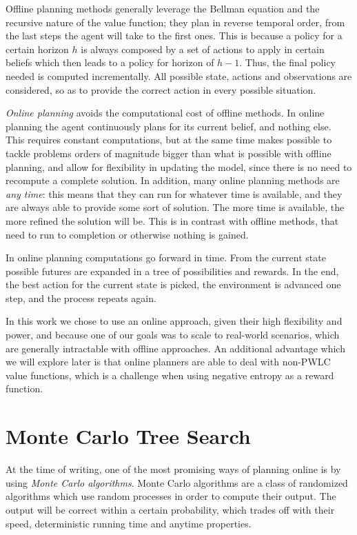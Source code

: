 Offline planning methods generally leverage the Bellman equation and the recursive nature of the
value function; they plan in reverse temporal order, from the last steps the agent will take to the
first ones. This is because a policy for a certain horizon $h$ is always composed by a set of
actions to apply in certain beliefs which then leads to a policy for horizon of $h-1$. Thus, the
final policy needed is computed incrementally. All possible state, actions and observations are
considered, so as to provide the correct action in every possible situation.

\textit{Online planning} avoids the computational cost of offline methods. In online planning the
agent continuously plans for its current belief, and nothing else. This requires constant
computations, but at the same time makes possible to tackle problems orders of magnitude bigger than
what is possible with offline planning, and allow for flexibility in updating the model, since there
is no need to recompute a complete solution. In addition, many online planning methods are
\textit{any time}: this means that they can run for whatever time is available, and they are always
able to provide some sort of solution. The more time is available, the more refined the solution
will be. This is in contrast with offline methods, that need to run to completion or otherwise
nothing is gained.

In online planning computations go forward in time. From the current state possible futures are
expanded in a tree of possibilities and rewards. In the end, the best action for the current state
is picked, the environment is advanced one step, and the process repeats again.

In this work we chose to use an online approach, given their high flexibility and power, and because
one of our goals was to scale to real-world scenarios, which are generally intractable with offline
approaches. An additional advantage which we will explore later is that online planners are able to
deal with non-PWLC value functions, which is a challenge when using negative entropy as a reward
function.

\section{Monte Carlo Tree Search}

At the time of writing, one of the most promising ways of planning online is by using \textit{Monte
Carlo algorithms}. Monte Carlo algorithms are a class of randomized algorithms which use random
processes in order to compute their output. The output will be correct within a certain probability,
which trades off with their speed, deterministic running time and anytime properties.

